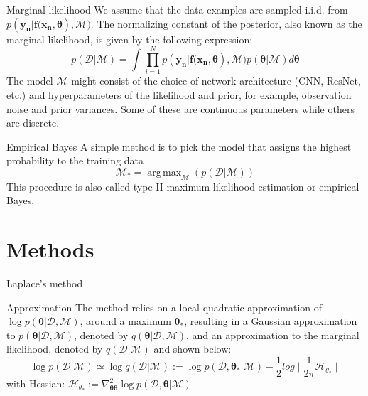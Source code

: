 \documentclass{beamer}
\DeclareMathOperator*{\argmax}{arg\,max}
\begin{document}
\begin{frame}{}
    \begin{block}{Marginal likelihood}
        We assume that the
        data examples are sampled i.i.d. from $p(\bm{y_{n}}|\bm{f(x_{n}, \theta}), \mathcal{M})$. The
        normalizing constant of the posterior, also known as the
        marginal likelihood, is given by the following expression:
        \begin{equation}
            p(\mathcal{D}|\mathcal{M})=\int_{}^{}\displaystyle\prod_{i=1}^N p(\boldsymbol{y_{n}}|\boldsymbol{f}\boldsymbol{(x_{n}}, \boldsymbol{\theta}), \mathcal{M})
            p(\boldsymbol{\theta}|\mathcal{M})d\boldsymbol{\theta}
        \end{equation}
        The model $\mathcal{M}$ might consist of the choice of network architecture (CNN, ResNet, etc.) and hyperparameters of the likelihood and prior, for example, observation noise and
        prior variances. Some of these are continuous parameters
        while others are discrete.
    \end{block}
\end{frame}

\begin{frame}{}
    \begin{block}{Empirical Bayes}
        A simple method is to pick the model that assigns the highest probability to the training data
        \begin{equation}
            \mathcal{M}_{*} = \argmax_{\mathcal{M}}(p(\mathcal{D}|\mathcal{M}))
        \end{equation}
        This procedure is also called type-II maximum likelihood estimation or empirical Bayes.
    \end{block}
\end{frame}


\section{Methods}
\begin{frame}{Laplace’s method}
    \begin{block}{Approximation}
        The method relies on a local quadratic approximation of $\log p(\boldsymbol{\theta}|\mathcal{D},\mathcal{M})$, around a maximum $\boldsymbol{\theta_{*}}$, resulting in a Gaussian approximation to $p(\boldsymbol{\theta}|\mathcal{D},\mathcal{M})$, denoted by $ q(\boldsymbol{\theta}|\mathcal{D},\mathcal{M})$, and an approximation to the marginal likelihood, denoted by $ q(\mathcal{D}|\mathcal{M})$ and shown below:
        \begin{equation}
        \log p(\mathcal{D}|\mathcal{M}) \simeq \log q(\mathcal{D}|\mathcal{M}):=
        \log p(\mathcal{D}, \boldsymbol{\theta_{*}}|\mathcal{M})
        - \frac{1}{2}log\mid\frac{1}{2\pi}\boldsymbol{\mathcal{H_{\theta_{*}}}}\mid
        \end{equation}
        with Hessian: $\boldsymbol{\mathcal{H_{\theta_{*}}}} := \nabla_{\boldsymbol{\theta\theta}}^{2}\log p(\mathcal{D}, \boldsymbol{\theta}|\mathcal{M})$
    \end{block}
\end{frame}
\end{document}
